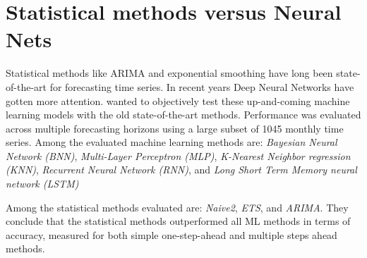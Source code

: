 \section{Statistical methods versus Neural Nets}
\label{section:RelatedWork:Statistical-NN}

Statistical methods like ARIMA and exponential smoothing have long been state-of-the-art for forecasting time series.
In recent years Deep Neural Networks have gotten more attention.
\cite{Makridakis2018} wanted to objectively test these up-and-coming machine learning models with the old state-of-the-art methods.
Performance was evaluated across multiple forecasting horizons using a large subset of 1045 monthly time series.
Among the evaluated machine learning methods are:
\textit{Bayesian Neural Network (BNN)},
\textit{Multi-Layer Perceptron (MLP)},
\textit{K-Nearest Neighbor regression (KNN)},
\textit{Recurrent Neural Network (RNN)}, and
\textit{Long Short Term Memory neural network (LSTM)}



Among the statistical methods evaluated are:
\textit{Naive2},
\textit{ETS}, and
\textit{ARIMA}.
They conclude that the statistical methods outperformed all ML methods in terms of accuracy, measured for both
simple one-step-ahead and multiple steps ahead methods.


